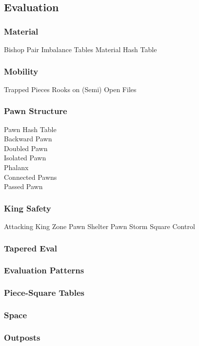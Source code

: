 \subsection{Evaluation} \setcounter{secnumdepth}{3}

\subsubsection{Material} \noindent 
Bishop Pair
Imbalance Tables
Material Hash Table
\subsubsection{Mobility} \noindent 
Trapped Pieces
Rooks on (Semi) Open Files
\subsubsection{Pawn Structure} \noindent 
Pawn Hash Table \\
Backward Pawn\\
Doubled Pawn\\
Isolated Pawn\\
Phalanx\\
Connected Pawns\\
Passed Pawn
\subsubsection*{King Safety}
Attacking King Zone
Pawn Shelter
Pawn Storm
Square Control
\subsubsection*{Tapered Eval}
\subsubsection*{Evaluation Patterns}
\subsubsection*{Piece-Square Tables}
\subsubsection*{Space}
\subsubsection*{Outposts}









